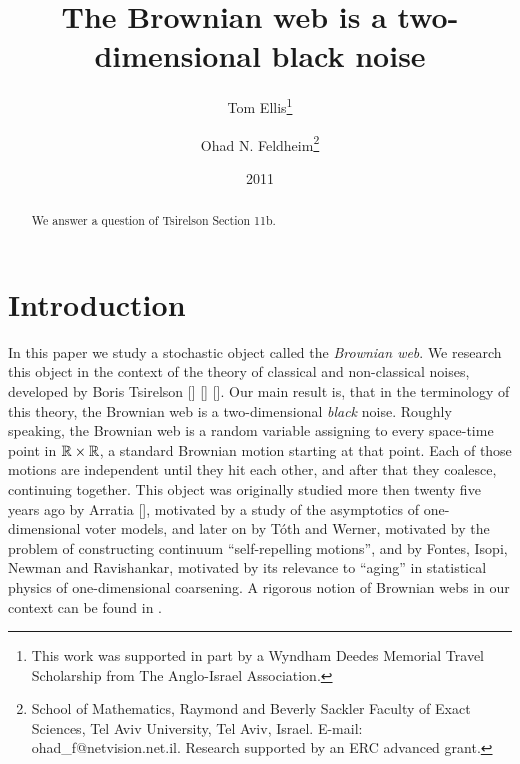 {
\title{The Brownian web is a two-dimensional black noise}

\newcommand{\tomthanks}{This work was supported in part by
a Wyndham Deedes Memorial Travel Scholarship from The Anglo-Israel
Association.}

\newcommand{\ohadthanks}{School of Mathematics, Raymond and Beverly Sackler Faculty of Exact
Sciences, Tel Aviv University, Tel Aviv, Israel. E-mail:
ohad\_f@netvision.net.il. Research supported by an ERC advanced grant.}

\author{Tom Ellis\thanks{\tomthanks}\\%
\and Ohad N. Feldheim\thanks{\ohadthanks}}

\date{2011}

\maketitle

\begin{abstract}
We answer a question of
Tsirelson \cite{tsirelson-nonclassical-stochastic-flows} Section 11b.

\end{abstract}

\section{Introduction}
In this paper we study a stochastic object called the \emph{Brownian web}. We
research this object in the context of the theory of classical and
non-classical noises, developed by Boris Tsirelson [] [] []. Our main result
is, that in the terminology of this theory, the Brownian web is a
two-dimensional \emph{black} noise.
 Roughly speaking, the Brownian web is a random variable assigning to
every space-time point in $\mathbb{R}\times\mathbb{R}$, a standard Brownian motion starting
at that point. Each of those motions are independent until they hit each
other, and after that they coalesce, continuing together. This object was
originally studied more then twenty five years ago by Arratia [], motivated
by a study of the asymptotics of one-dimensional voter models, and later on
by T\'{o}th and Werner, motivated by the problem of constructing continuum
``self-repelling motions'', and by Fontes, Isopi, Newman and Ravishankar,
motivated by its relevance to ``aging'' in statistical physics of
one-dimensional coarsening. A rigorous notion of Brownian webs in our context
can be found in .

}
